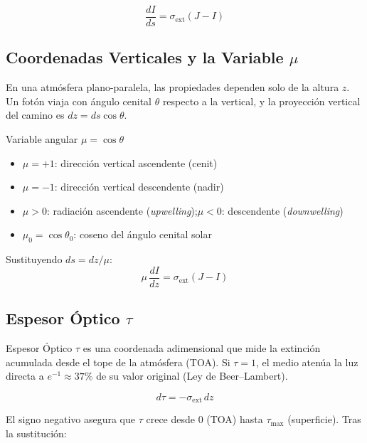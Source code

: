 \documentclass[a4paper,11pt]{article}
\begin{document}
\begin{equation}\label{eq:rte_path}
    \frac{dI}{ds} = \sigma_{\text{ext}}(J - I)
\end{equation}

\subsection{Coordenadas Verticales y la Variable $\mu$}

En una atm\'osfera plano-paralela, las propiedades dependen solo de la altura
$z$.  Un fot\'on viaja con \'angulo cenital $\theta$ respecto a la vertical, y
la proyecci\'on vertical del camino es $dz = ds\cos\theta$.

\begin{concept}{Variable angular $\mu = \cos\theta$}
\begin{itemize}
    \item $\mu = +1$: direcci\'on vertical ascendente (cenit)
    \item $\mu = -1$: direcci\'on vertical descendente (nadir)
    \item $\mu > 0$: radiaci\'on ascendente (\emph{upwelling});\quad $\mu < 0$: descendente (\emph{downwelling})
    \item $\mu_0 = \cos\theta_0$: coseno del \'angulo cenital solar
\end{itemize}
\end{concept}

Sustituyendo $ds = dz/\mu$:
\begin{equation}
    \mu\,\frac{dI}{dz} = \sigma_{\text{ext}}(J - I)
\end{equation}

\subsection{Espesor \'Optico $\tau$}

\begin{physics}{Espesor \'Optico}
$\tau$ es una coordenada adimensional que mide la extinci\'on acumulada desde el
tope de la atm\'osfera (TOA).  Si $\tau = 1$, el medio aten\'ua la luz directa a
$e^{-1}\approx 37\%$ de su valor original (Ley de Beer--Lambert).
\end{physics}

\begin{equation}
    d\tau = -\sigma_{\text{ext}}\,dz
\end{equation}

El signo negativo asegura que $\tau$ crece desde 0 (TOA) hasta $\tau_{\max}$
(superficie).  Tras la sustituci\'on:
\end{document}
